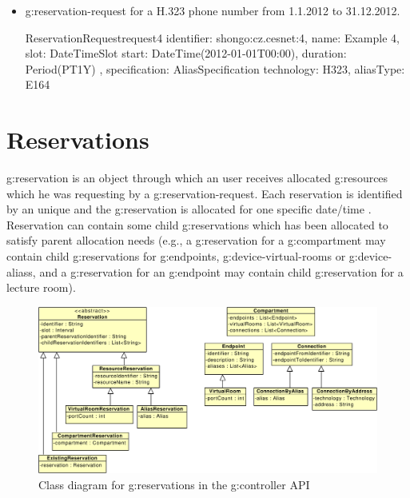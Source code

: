 \begin{itemize}
\item \Gls{g:reservation-request} for a H.323 phone number from 1.1.2012 to 31.12.2012.

\label{oc:request4}
\begin{ObjectCode}{ReservationRequest}{request4}{}
identifier: shongo:cz.cesnet:4,
name: Example 4,
slot: DateTimeSlot {
  start: DateTime(2012-01-01T00:00),
  duration: Period(PT1Y)
},
specification: AliasSpecification {
  technology: H323,
  aliasType: E164
}
\end{ObjectCode}

\end{itemize}


\section{Reservations}

\Gls{g:reservation} is an object through which an user receives allocated \glspl{g:resource} which he was requesting by a \gls{g:reservation-request}. Each reservation is identified by an unique  and the \gls{g:reservation} is allocated for one specific date/time . Reservation can contain some child \glspl{g:reservation} which has been allocated to satisfy parent allocation needs (e.g., a \gls{g:reservation} for a \gls{g:compartment} may contain child \glspl{g:reservation} for \glspl{g:endpoint}, \glspl{g:device-virtual-room} or \glspl{g:device-alias}, and a \gls{g:reservation} for an \gls{g:endpoint} may contain child \gls{g:reservation} for a lecture room).

\begin{figure}[ht!]
\includegraphics[width=\textwidth]{diagrams/cd_api_reservations}
\caption{Class diagram for \glspl{g:reservation} in the \gls{g:controller} API}
\label{fig:cd_api_reservations}
\end{figure}


